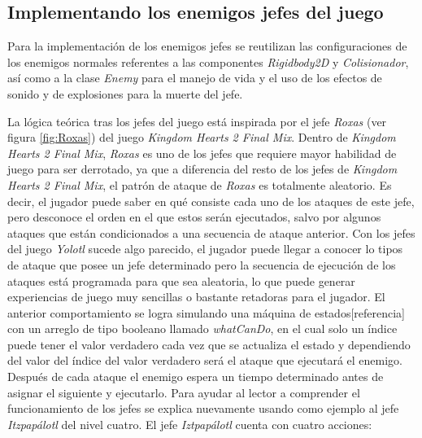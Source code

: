 \subsection{Implementando los enemigos jefes del juego}
Para la implementación de los enemigos jefes se reutilizan las configuraciones de los enemigos
normales referentes a las componentes \textit{Rigidbody2D} y \textit{Colisionador}, así como 
a la clase \textit{Enemy} para el manejo de vida y el uso de los efectos
de sonido y de explosiones para la muerte del jefe.
\\
\par
La lógica teórica tras los jefes del juego está inspirada por el jefe
\textit{Roxas} (ver figura \ref{fig:Roxas}) del juego \textit{Kingdom Hearts 2
Final Mix}. Dentro de \textit{Kingdom Hearts 2 Final Mix}, \textit{Roxas} es uno
de los jefes que requiere mayor habilidad de juego para ser derrotado, ya que a
diferencia del resto de los jefes de \textit{Kingdom Hearts 2 Final Mix}, el
patrón de ataque de \textit{Roxas} es totalmente aleatorio. Es decir, el jugador
puede saber en qué consiste cada uno de los ataques de este jefe, pero desconoce
el orden en el que estos serán ejecutados, salvo por algunos ataques que están
condicionados a una secuencia de ataque anterior.  Con los jefes del juego
\textit{Yolotl} sucede algo parecido, el jugador puede llegar a conocer lo tipos
de ataque que posee un jefe determinado pero la secuencia de ejecución de los
ataques está programada para que sea aleatoria, lo que puede generar experiencias
de juego muy sencillas o bastante retadoras para el jugador. El anterior
comportamiento se logra simulando una máquina de estados[referencia] 
con un arreglo de tipo booleano llamado \textit{whatCanDo}, en el cual solo un índice puede tener el
valor verdadero cada vez que se actualiza el estado y dependiendo del valor del
índice del valor verdadero será el ataque que ejecutará el enemigo. Después de
cada ataque el enemigo espera un tiempo determinado antes de asignar el siguiente
y ejecutarlo. Para ayudar al lector a comprender el funcionamiento de los jefes se
explica nuevamente usando como ejemplo al jefe \textit{Itzpapálotl} del nivel
cuatro. El jefe \textit{Iztpapálotl} cuenta con cuatro acciones:
